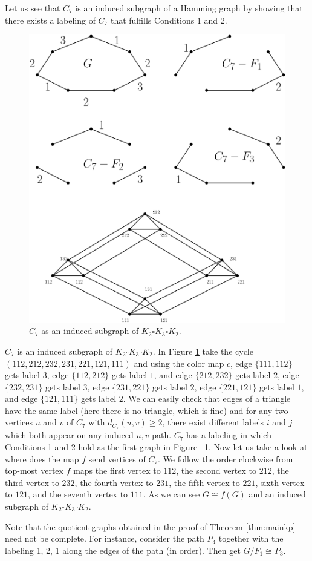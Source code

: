 \documentclass[12pt,a4paper,titlepage,openany]{report}
\begin{document}
\begin{example} Let us see that $C_7$ is an induced subgraph of a Hamming graph by showing that there exists a labeling of $C_7$ that fulfills Conditions $1$ and $2$.
\begin{figure}[h!]
\begin{center}
\includegraphics[width=0.8\linewidth]{figures/c_7inducedhamming.png}
\end{center}
\caption{$C_7$ as an induced subgraph of $K_2\square K_3\square K_2$.}\label{fig:c7induced}
\end{figure}
\newline
$C_7$ is an induced subgraph of $K_2\square K_3\square K_2$. In Figure \ref{fig:c7induced} take the cycle $(112,212,232,231,221,121,111)$ and using the color map $c$, edge $\{111,112\}$ gets label $3$, edge $\{112,212\}$ gets label $1$, and edge $\{212,232\}$ gets label $2$, edge $\{232,231\}$ gets label $3$, edge $\{231,221\}$ gets label $2$, edge $\{221,121\}$ gets label $1$, and edge $\{121,111\}$ gets label $2$. We can easily check that edges of a triangle have the same label (here there is no triangle, which is fine) and for any two vertices $u$ and $v$ of $C_7$ with $d_{C_7}(u,v) \geq 2$, there exist different labels $i$ and $j$ which both appear on any induced $u, v$-path.\newline
$C_7$ has a labeling in which Conditions 1 and 2 hold as the first graph in Figure ~\ref{fig:c7induced}. Now let us take a look at where does the map $f$ send vertices of $C_7$. We follow the order clockwise from top-most vertex $f$ maps the first vertex to $112$, the second vertex to $212$, the third vertex to $232$, the fourth vertex to $231$, the fifth vertex to $221$, sixth vertex to $121$, and the seventh vertex to $111$. As we can see $G\cong f(G)$ and an induced subgraph of $K_2\square K_3\square K_2$.
\end{example}
Note that the quotient graphs obtained in the proof of Theorem \ref{thm:mainkp} need not be complete. For instance, consider the path $P_4$ together with the labeling 1, 2, 1 along the edges of the path (in order). Then get $G/ F_1\cong P_3$.
\end{document}
